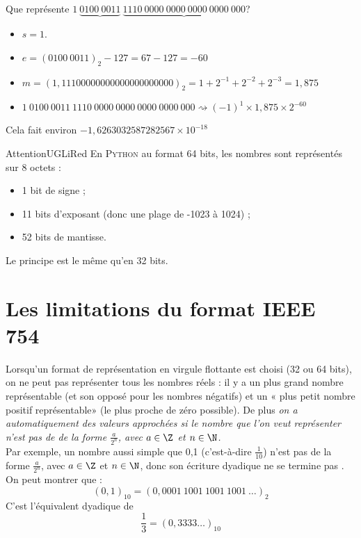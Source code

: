 \begin{exemple}
    Que représente $1\ \underbrace{0100\ 0011}\ \underbrace{1110\ 0000\ 0000\ 0000\ 0000\ 000}$?
    \begin{itemize}
        \item $s = 1$.
        \item $e =(0100\ 0011)_2-127=67-127=-60$
        \item $m= (\boxed{1},1110 0000 0000 0000 0000 000)_2=1+2^{-1}+2^{-2}+2^{-3}=1,875$
        \item $1\ 0100\ 0011\ 1110\ 0000\ 0000\ 0000\ 0000\ 000\rightsquigarrow (-1)^1\times 1,875\times 2^{-60}$
    \end{itemize}
    Cela fait environ $-1,6263032587282567\times 10^{-18}$
\end{exemple}

\begin{encadrecolore}{Attention}{UGLiRed}
    En \textsc{Python} au format 64 bits, les nombres sont représentés sur 8 octets :
    \begin{itemize}
        \item 1 bit de signe ;
        \item 11 bits d'exposant (donc une plage de -1023 à 1024) ;
        \item 52 bits de mantisse.
    \end{itemize}
    Le principe est le même qu'en 32 bits.
\end{encadrecolore}

\section{Les limitations du format IEEE 754}


Lorsqu'un format de représentation en virgule flottante est choisi (32 ou 64 bits), on ne peut pas représenter tous les nombres réels : il y a un
plus grand nombre représentable (et son opposé pour les nombres négatifs) et un « plus petit nombre positif représentable»  (le plus proche de
zéro possible). De plus \textit{ on a automatiquement des valeurs approchées si le nombre que l'on veut représenter n'est pas de de la forme $\frac{a}{2^n}$, avec $a\in\Z$ et $n\in\N$.}\\

Par exemple, un nombre aussi simple que 0,1 (c'est-à-dire $\frac{1}{10}$) n'est pas de la forme $\frac{a}{2^n}$, avec $a\in\Z$ et $n\in\N$, donc son
écriture dyadique ne se termine pas .\\
On peut montrer que :$$(0,1)_{10} = (0,0001\ 1001\ 1001\ 1001\ \ldots)_2$$
C'est l'équivalent dyadique de $$\dfrac{1}{3}=(0,3333\ldots)_{10}$$

